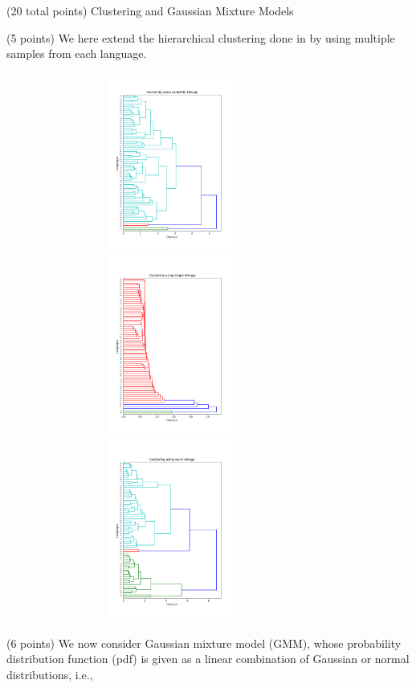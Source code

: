 \documentclass[12pt]{article}
\begin{document}
\begin{question}{(20 total points) Clustering and Gaussian Mixture Models}
\begin{subquestion}{(5 points)
       We here extend the hierarchical clustering done in  by
       using multiple samples from each language.
     }
      \begin{answerbox}{50em}
         \begin{center}
            \includegraphics[width=0.81\textwidth, height=16em]{results/3_4_complete.png}\vfill
            \includegraphics[width=0.81\textwidth, height=16em]{results/3_4_single.png}\vfill
            \includegraphics[width=0.81\textwidth, height=16em]{results/3_4_ward.png}

         \end{center}
      \end{answerbox}
  


   \end{subquestion}
   \begin{subquestion}{(6 points)
       We now consider Gaussian mixture model (GMM), whose
       probability distribution function (pdf) is given as
       a linear combination of Gaussian or normal distributions, i.e.,
     } \label{Q3.5}





\end{subquestion}
\end{question}
\end{document}
